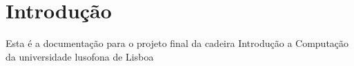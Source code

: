 \hypertarget{index_intro_sec}{}\section{Introdução}\label{index_intro_sec}
Esta é a documentação para o projeto final da cadeira Introdução a Computação da universidade lusofona de Lisboa 
